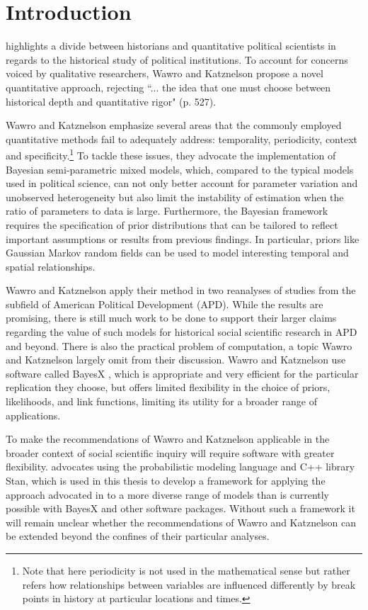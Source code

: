 \chapter{Introduction}
\label{introduction}

 highlights a divide between historians and quantitative political scientists in regards to the historical study of political institutions. To account for concerns voiced by qualitative researchers, Wawro and Katznelson propose a novel quantitative approach, rejecting ``... the idea that one must choose between historical depth and quantitative rigor" (p. 527).

Wawro and Katznelson emphasize several areas that the commonly employed quantitative methods fail to adequately address: temporality, periodicity, context and specificity.\footnote{Note that here periodicity is not used in the mathematical sense but rather refers how relationships between variables are influenced differently by break points in history at particular locations and times.}  To tackle these issues, they advocate the implementation of Bayesian semi-parametric mixed models, which, compared to the typical models used in political science, can not only better account for parameter variation and unobserved heterogeneity but also limit the instability of estimation when the ratio of parameters to data is large. Furthermore, the Bayesian framework requires the specification of prior distributions that can be tailored to reflect important assumptions or results from previous findings. In particular, priors like Gaussian Markov random fields can be used to model interesting temporal and spatial relationships. 

Wawro and Katznelson apply their method in two reanalyses of studies from the subfield of American Political Development (APD). While the results are promising, there is still much work to be done to support their larger claims regarding the value of such models for historical social scientific research in APD and beyond. There is also the practical problem of computation, a topic Wawro and Katznelson largely omit from their discussion. Wawro and Katznelson use software called BayesX , which is appropriate and very efficient for the particular replication they choose, but offers limited flexibility in the choice of priors, likelihoods, and link functions, limiting its utility for a broader range of applications. 

To make the recommendations of Wawro and Katznelson applicable in the broader context of social scientific inquiry will require software with greater flexibility.  advocates using the probabilistic modeling language and C++ library Stan, which is used in this thesis to develop a framework for applying the approach advocated in  to a more diverse range of models than is currently possible with BayesX and other software packages.  Without such a framework it will remain unclear whether the recommendations of Wawro and Katznelson can be extended beyond the confines of their particular analyses.  

